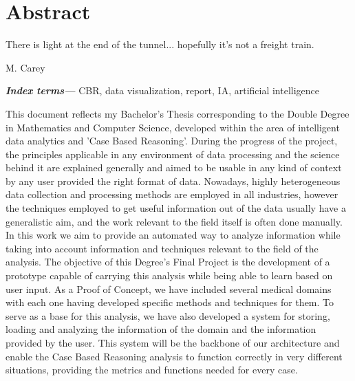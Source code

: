 %
%
%
%
%

\chapter{Abstract}

\begin{FraseCelebre}
\begin{Frase}
There is light at the end of the tunnel... hopefully it's not a freight train.
\end{Frase}
\begin{Fuente}
M. Carey
\end{Fuente}
\end{FraseCelebre}
\providecommand{\keywords}[1]{\textbf{\textit{Index terms---}} #1}
\keywords{CBR, data visualization, report, IA, artificial intelligence}


This document reflects my Bachelor's Thesis corresponding to the Double Degree in Mathematics and Computer Science, developed within the area of intelligent data analytics and 'Case Based Reasoning'. 
During the progress of the project, the principles applicable in any environment of data processing and the science behind it are explained generally and aimed to be usable in any kind of context by any user provided the right format of data.
Nowadays, highly heterogeneous data collection and processing methods are employed in all industries, 
however the techniques employed to get useful information out of the data usually have a generalistic aim, 
and the work relevant to the field itself is often done manually. In this work we aim to provide an automated way to analyze information while taking into account information and techniques relevant to the field of the analysis.
The objective of this Degree's Final Project is the development of a prototype capable of carrying this analysis while being able to learn based on user input. As a Proof of Concept, we have included several medical domains with each one having developed specific methods and techniques for them.
To serve as a base for this analysis, we have also developed a system for storing, loading and analyzing the information of the domain and the information provided by the user. This system will be the backbone of our architecture and enable the Case Based Reasoning analysis to function correctly in very different situations, providing the metrics and functions needed for every case.

